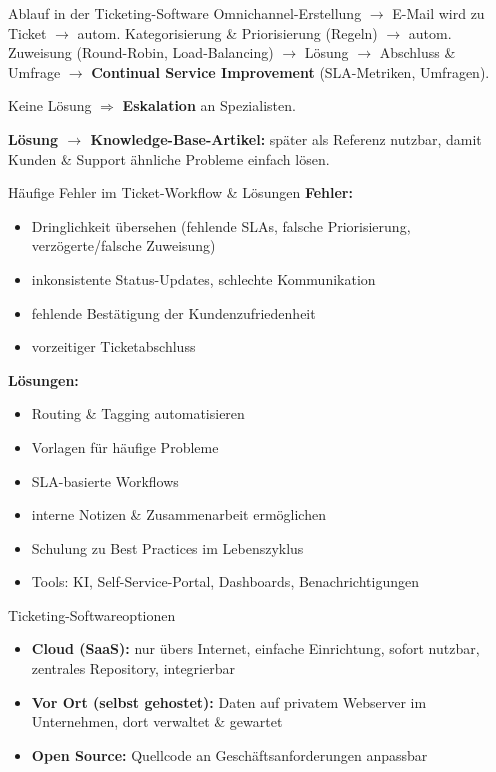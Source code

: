 \documentclass[a4paper, fontsize=7pt]{scrartcl}
\begin{document}
\begin{mainbox}{Ablauf in der Ticketing-Software}
Omnichannel-Erstellung $\to$ E-Mail wird zu Ticket $\to$ autom.
Kategorisierung \& Priorisierung (Regeln) $\to$ autom. Zuweisung
(Round-Robin, Load-Balancing) $\to$ Lösung $\to$ Abschluss \& Umfrage $\to$
\textbf{Continual Service Improvement} (SLA-Metriken, Umfragen).

Keine Lösung $\Rightarrow$ \textbf{Eskalation} an Spezialisten.

\textbf{Lösung $\to$ Knowledge-Base-Artikel:} später als Referenz nutzbar,
damit Kunden \& Support ähnliche Probleme einfach lösen.
\end{mainbox}

\begin{mainbox}{Häufige Fehler im Ticket-Workflow \& Lösungen}
\textbf{Fehler:}
\begin{itemize}
    \item Dringlichkeit übersehen (fehlende SLAs, falsche Priorisierung,
          verzögerte/falsche Zuweisung)
    \item inkonsistente Status-Updates, schlechte Kommunikation
    \item fehlende Bestätigung der Kundenzufriedenheit
    \item vorzeitiger Ticketabschluss
\end{itemize}
\textbf{Lösungen:}
\begin{itemize}
    \item Routing \& Tagging automatisieren
    \item Vorlagen für häufige Probleme
    \item SLA-basierte Workflows
    \item interne Notizen \& Zusammenarbeit ermöglichen
    \item Schulung zu Best Practices im Lebenszyklus
    \item Tools: KI, Self-Service-Portal, Dashboards, Benachrichtigungen
\end{itemize}
\end{mainbox}

\begin{mainbox}{Ticketing-Softwareoptionen}
\begin{itemize}
    \item \textbf{Cloud (SaaS):} nur übers Internet, einfache Einrichtung,
          sofort nutzbar, zentrales Repository, integrierbar
    \item \textbf{Vor Ort (selbst gehostet):} Daten auf privatem Webserver im
          Unternehmen, dort verwaltet \& gewartet
    \item \textbf{Open Source:} Quellcode an Geschäftsanforderungen anpassbar
\end{itemize}
\end{mainbox}
\end{document}
